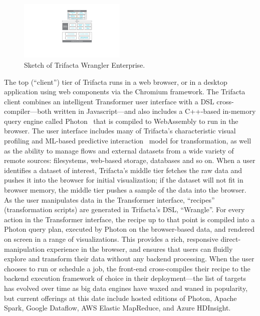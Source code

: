 \documentclass[11pt]{article}
\begin{document}
\begin{figure}
    \centering
    \includegraphics[width=0.45\textwidth]{figs/arch.pdf}
    \caption{Sketch of Trifacta Wrangler Enterprise.}
    \label{fig:my_label}
\end{figure}
The top (``client'') tier of Trifacta runs in a web browser, or in a desktop application using web components via the Chromium framework. The Trifacta client combines an intelligent Transformer user interface with a DSL cross-compiler---both written in Javascript---and also includes a C++-based in-memory query engine called Photon~\cite{photon} that is compiled to WebAssembly to run in the browser. The user interface includes many of Trifacta's characteristic visual profiling and ML-based predictive interaction~\cite{cidr-pi} model for transformation, as well as the ability to manage flows and external datasets from a wide variety of remote sources: filesystems, web-based storage, databases and so on. When a user identifies a dataset of interest, Trifacta's middle tier fetches the raw data and pushes it into the browser for initial visualization; if the dataset will not fit in browser memory, the middle tier pushes a sample of the data into the browser. As the user manipulates data in the Transformer interface, ``recipes'' (transformation scripts) are generated in Trifacta's DSL, ``Wrangle''. 
For every action in the Transformer interface, the recipe up to that point is compiled into a Photon query plan, executed by Photon on the browser-based data, and rendered on screen in a range of visualizations. This provides a rich, responsive direct-manipulation experience in the browser, and ensures that users can fluidly explore and transform their data without any backend processing. When the user chooses to run or schedule a job, the front-end cross-compiles their recipe to the backend execution framework of choice in their deployment---the list of targets has evolved over time as big data engines have waxed and waned in popularity, but current offerings at this date include hosted editions of Photon, Apache Spark, Google Dataflow, AWS Elastic MapReduce, and Azure HDInsight.
\end{document}
